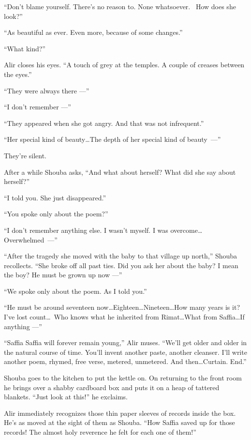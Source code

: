 \documentclass[twoside,11pt]{book}
\begin{document}
``Don't blame yourself. There's no reason to. None whatsoever.~ How does she look?''

``As beautiful as ever. Even more, because of some changes.''

``What kind?''

Alir closes his eyes. ``A touch of grey at the temples. A couple of creases between the
eyes.''

``They were always there ---''

``I don't remember ---''

``They appeared when she got angry. And that was not infrequent.''

``Her special kind of beauty{\ldots}The depth of her special kind of beauty~---''

They're silent.

After a while Shouba asks, ``And what about herself? What did she say about herself?''

``I told you. She just disappeared.''

``You spoke only about the poem?''

``I don't remember anything else. I wasn't myself. I was
overcome{\ldots}\linebreak[0]\hbox{Overwhelmed~---''}

``After the tragedy she moved with the baby to that village up north,'' Shouba recollects.
``She broke off all past ties. Did you ask her about the baby? I mean the boy? He must be grown up now ---''

``We spoke only about the poem. As I told you.''

``He must be around seventeen now{\ldots}Eighteen{\ldots}Nineteen{\ldots}How many years is it? I've lost
count{\ldots}~Who knows what he inherited from Rimat{\ldots}What from Saffia{\ldots}If anything ---''

``Saffia Saffia will forever remain young,'' Alir muses. ``We'll get older and
older in the natural course of time. You'll invent another paste, another cleanser. I'll write another poem, rhymed,
free verse, metered, unmetered. And then{\ldots}Curtain. End.''

Shouba goes to the kitchen to put the kettle on. On returning to the front room he brings over a shabby cardboard box
and puts it on a heap of tattered blankets. ``Just look at this!'' he exclaims.

Alir immediately recognizes those thin paper sleeves of records inside the box. He's as moved at the sight of them as
Shouba. ``How Saffia saved up for those records! The almost holy reverence he felt for each one of
them!''
\end{document}
